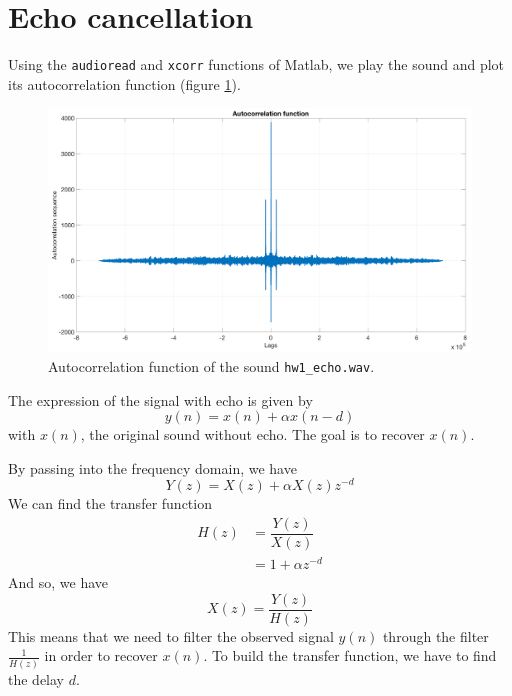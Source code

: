 \documentclass[a4paper, 12pt]{article}
\begin{document}
	\section{Echo cancellation}
	Using the \texttt{audioread} and \texttt{xcorr} functions of Matlab, we play the sound and plot its autocorrelation function (figure \ref{fig:sound_autocorrelation}).\par
	\begin{figure}[!ht]
	    \centering
	    \includegraphics[width=1\textwidth]{resources/pdf/sound_autocorrelation.pdf}
	    \caption{Autocorrelation function of the sound \texttt{hw1\_echo.wav}.}
	    \label{fig:sound_autocorrelation}
	\end{figure}
	The expression of the signal with echo is given by
	\begin{equation*}
	    y(n) = x(n) + \alpha x(n-d)
	\end{equation*}
	with $x(n)$, the original sound without echo. The goal is to recover $x(n)$.\par
	By passing into the frequency domain, we have
	\begin{equation*}
	    Y(z) = X(z) + \alpha X(z)z^{-d}
	\end{equation*}
	We can find the transfer function
	\begin{align*}
	    H(z) &= \dfrac{Y(z)}{X(z)}\\
	    &= 1 + \alpha z^{-d}
	\end{align*}
	And so, we have
	\begin{equation*}
	    X(z) = \dfrac{Y(z)}{H(z)}
	\end{equation*}
	This means that we need to filter the observed signal $y(n)$ through the filter $\frac{1}{H(z)}$ in order to recover $x(n)$. To build the transfer function, we have to find the delay $d$.\par
\end{document}
